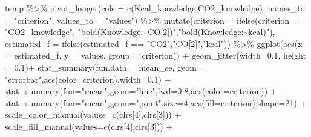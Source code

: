 \documentclass[
  letterpaper,
  DIV=11,
  numbers=noendperiod]{scrartcl}
\newenvironment{Shaded}{\begin{snugshade}}{\end{snugshade}}
\newcommand{\AttributeTok}[1]{\textcolor[rgb]{0.40,0.45,0.13}{#1}}
\newcommand{\DecValTok}[1]{\textcolor[rgb]{0.68,0.00,0.00}{#1}}
\newcommand{\FloatTok}[1]{\textcolor[rgb]{0.68,0.00,0.00}{#1}}
\newcommand{\FunctionTok}[1]{\textcolor[rgb]{0.28,0.35,0.67}{#1}}
\newcommand{\NormalTok}[1]{\textcolor[rgb]{0.00,0.23,0.31}{#1}}
\newcommand{\SpecialCharTok}[1]{\textcolor[rgb]{0.37,0.37,0.37}{#1}}
\newcommand{\StringTok}[1]{\textcolor[rgb]{0.13,0.47,0.30}{#1}}
\begin{document}
\begin{Shaded}
\begin{Highlighting}[]
\NormalTok{temp }\SpecialCharTok{\%\textgreater{}\%} 
  \FunctionTok{pivot\_longer}\NormalTok{(}\AttributeTok{cols      =} \FunctionTok{c}\NormalTok{(Kcal\_knowledge,CO2\_knowledge),}
               \AttributeTok{names\_to  =} \StringTok{"criterion"}\NormalTok{,}
               \AttributeTok{values\_to =} \StringTok{"values"}\NormalTok{) }\SpecialCharTok{\%\textgreater{}\%} 
  \FunctionTok{mutate}\NormalTok{(}\AttributeTok{criterion   =} \FunctionTok{ifelse}\NormalTok{(criterion   }\SpecialCharTok{==} \StringTok{"CO2\_knowledge"}\NormalTok{, }\StringTok{"bold(Knowledge:\textasciitilde{}CO[2])"}\NormalTok{,}\StringTok{"bold(Knowledge:\textasciitilde{}kcal)"}\NormalTok{),}
         \AttributeTok{estimated\_f =} \FunctionTok{ifelse}\NormalTok{(estimated\_f }\SpecialCharTok{==} \StringTok{"CO2"}\NormalTok{,}\StringTok{"CO[2]"}\NormalTok{,}\StringTok{"kcal"}\NormalTok{)) }\SpecialCharTok{\%\textgreater{}\%} 
  \FunctionTok{ggplot}\NormalTok{(}\FunctionTok{aes}\NormalTok{(}\AttributeTok{x =}\NormalTok{ estimated\_f, }\AttributeTok{y =}\NormalTok{ values,  }\AttributeTok{group =}\NormalTok{ criterion)) }\SpecialCharTok{+}
    \FunctionTok{geom\_jitter}\NormalTok{(}\AttributeTok{width=}\FloatTok{0.1}\NormalTok{, }\AttributeTok{height =} \FloatTok{0.1}\NormalTok{)}\SpecialCharTok{+} 
    \FunctionTok{stat\_summary}\NormalTok{(}\AttributeTok{fun.data =}\NormalTok{ mean\_se, }\AttributeTok{geom =} \StringTok{"errorbar"}\NormalTok{,}\FunctionTok{aes}\NormalTok{(}\AttributeTok{color=}\NormalTok{criterion),}\AttributeTok{width=}\FloatTok{0.1}\NormalTok{) }\SpecialCharTok{+}
    \FunctionTok{stat\_summary}\NormalTok{(}\AttributeTok{fun=}\StringTok{"mean"}\NormalTok{,}\AttributeTok{geom=}\StringTok{"line"}\NormalTok{,}\AttributeTok{lwd=}\FloatTok{0.8}\NormalTok{,}\FunctionTok{aes}\NormalTok{(}\AttributeTok{color=}\NormalTok{criterion)) }\SpecialCharTok{+}
    \FunctionTok{stat\_summary}\NormalTok{(}\AttributeTok{fun=}\StringTok{"mean"}\NormalTok{,}\AttributeTok{geom=}\StringTok{"point"}\NormalTok{,}\AttributeTok{size=}\DecValTok{4}\NormalTok{,}\FunctionTok{aes}\NormalTok{(}\AttributeTok{fill=}\NormalTok{criterion),}\AttributeTok{shape=}\DecValTok{21}\NormalTok{) }\SpecialCharTok{+}
    \FunctionTok{scale\_color\_manual}\NormalTok{(}\AttributeTok{values=}\FunctionTok{c}\NormalTok{(clrs[}\DecValTok{4}\NormalTok{],clrs[}\DecValTok{3}\NormalTok{])) }\SpecialCharTok{+}
    \FunctionTok{scale\_fill\_manual}\NormalTok{(}\AttributeTok{values=}\FunctionTok{c}\NormalTok{(clrs[}\DecValTok{4}\NormalTok{],clrs[}\DecValTok{3}\NormalTok{])) }\SpecialCharTok{+}

\end{Highlighting}
\end{Shaded}
\end{document}
